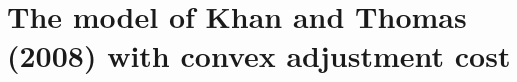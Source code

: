\documentclass[12pt]{article}
\begin{document}
\small\normalsize%
\doublespace

\clearpage
\section*{The model of Khan and Thomas (2008) with convex adjustment cost}

\end{document}
